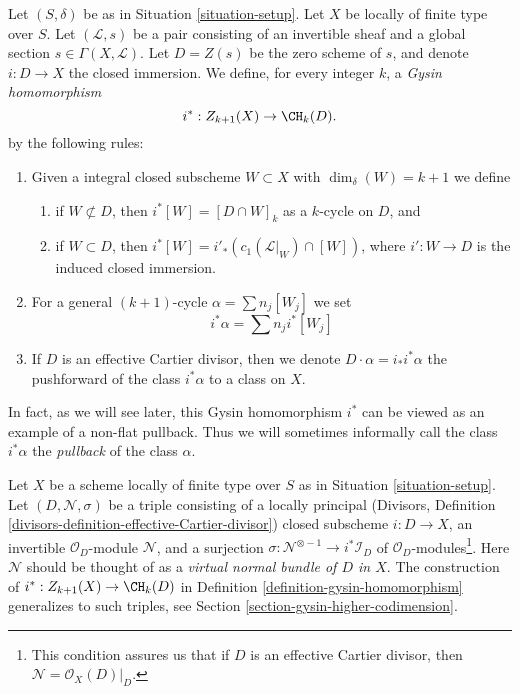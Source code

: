 \begin{definition}
\label{definition-gysin-homomorphism}
Let $(S, \delta)$ be as in Situation \ref{situation-setup}.
Let $X$ be locally of finite type over $S$.
Let $(\mathcal{L}, s)$ be a pair consisting of an invertible
sheaf and a global section $s \in \Gamma(X, \mathcal{L})$.
Let $D = Z(s)$ be the zero scheme of $s$, and
denote $i : D \to X$ the closed immersion.
We define, for every integer $k$, a {\it Gysin homomorphism}
$$
i^* : Z_{k + 1}(X) \to \CH_k(D).
$$
by the following rules:
\begin{enumerate}
\item Given a integral closed subscheme $W \subset X$ with
$\dim_\delta(W) = k + 1$ we define
\begin{enumerate}
\item if $W \not \subset D$, then $i^*[W] = [D \cap W]_k$ as a
$k$-cycle on $D$, and
\item if $W \subset D$, then
$i^*[W] = i'_*(c_1(\mathcal{L}|_W) \cap [W])$,
where $i' : W \to D$ is the induced closed immersion.
\end{enumerate}
\item For a general $(k + 1)$-cycle $\alpha = \sum n_j[W_j]$
we set
$$
i^*\alpha = \sum n_j i^*[W_j]
$$
\item If $D$ is an effective Cartier divisor, then we denote
$D \cdot \alpha = i_*i^*\alpha$ the pushforward of the class $i^*\alpha$
to a class on $X$.
\end{enumerate}
\end{definition}

\noindent
In fact, as we will see later, this Gysin homomorphism $i^*$ can be viewed
as an example of a non-flat pullback. Thus we will sometimes informally
call the class $i^*\alpha$ the {\it pullback} of the class $\alpha$.

\begin{remark}
\label{remark-generalize-to-virtual}
Let $X$ be a scheme locally of finite type over $S$ as in
Situation \ref{situation-setup}. Let $(D, \mathcal{N}, \sigma)$
be a triple consisting of a locally principal (Divisors, Definition
\ref{divisors-definition-effective-Cartier-divisor}) closed subscheme
$i : D \to X$, an invertible $\mathcal{O}_D$-module $\mathcal{N}$, and
a surjection $\sigma : \mathcal{N}^{\otimes -1} \to i^*\mathcal{I}_D$
of $\mathcal{O}_D$-modules\footnote{This condition assures us that if
$D$ is an effective Cartier divisor, then $\mathcal{N} = \mathcal{O}_X(D)|_D$.}.
Here $\mathcal{N}$ should be thought of as
a {\it virtual normal bundle of $D$ in $X$}. The construction of
$i^* : Z_{k + 1}(X) \to \CH_k(D)$ in
Definition \ref{definition-gysin-homomorphism}
generalizes to such triples, see
Section \ref{section-gysin-higher-codimension}.
\end{remark}

